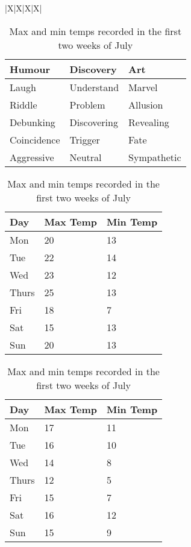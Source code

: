\begin{table}[!htbp]
  \everyrow{\hrule}
  \tabulinesep{2mm}
  \begin{tabu}{|X|X|X|X|}


\begin{table}[!htbp] %
\centering
\begin{tabular}{|l|l|l|}
\hline
\textbf{Humour} & \textbf{Discovery} & \textbf{Art} \\ \hline
Laugh           & Understand         & Marvel       \\ \hline
Riddle          & Problem            & Allusion     \\ \hline
Debunking       & Discovering        & Revealing    \\ \hline
Coincidence     & Trigger            & Fate         \\ \hline
Aggressive      & Neutral            & Sympathetic  \\ \hline
\end{tabular}
\caption[Text for Table of Contents]{Caption text under table}
\end{table}

\begin{table}[!htbp]
    \begin{subtable}[h]{0.45\textwidth}
        \centering
        \begin{tabular}{l | l | l}
        Day & Max Temp & Min Temp \\
        \hline \hline
        Mon & 20 & 13\\
        Tue & 22 & 14\\
        Wed & 23 & 12\\
        Thurs & 25 & 13\\
        Fri & 18 & 7\\
        Sat & 15 & 13\\
        Sun & 20 & 13
        \end{tabular}
        \caption{First Week}
\label{tab:week1}
    \end{subtable}
    \hfill
    \begin{subtable}[h]{0.45\textwidth}
        \centering
        \begin{tabular}{l | l | l}
        Day & Max Temp & Min Temp \\
        \hline \hline
        Mon & 17 & 11\\
        Tue & 16 & 10\\
        Wed & 14 & 8\\
        Thurs & 12 & 5\\
        Fri & 15 & 7\\
        Sat & 16 & 12\\
        Sun & 15 & 9
        \end{tabular}
        \caption{Second Week}
\label{tab:week2}
    \end{subtable}
    \caption{Max and min temps recorded in the first two weeks of July}
\label{tab:temps}
\end{table}


\end{tabu}
\end{table}
